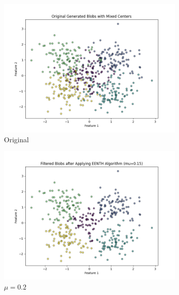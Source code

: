 \begin{figure}[htbp]
	\centering
	\begin{subfigure}[b]{0.3\textwidth}
		\centering
		\includegraphics[width=\textwidth]{figures/eenth/original_blobs}
		\caption{Original}
		\label{fig:original}
	\end{subfigure}
	\hfill
	\begin{subfigure}[b]{0.3\textwidth}
		\centering
		\includegraphics[width=\textwidth]{figures/eenth/filtered_blobs_mu_0.15}
		\caption{$\mu = 0.2$}
		\label{fig:mu0.2}
	\end{subfigure}
	\hfill
	\begin{subfigure}[b]{0.3\textwidth}
		\centering

\end{subfigure}
\end{figure}
